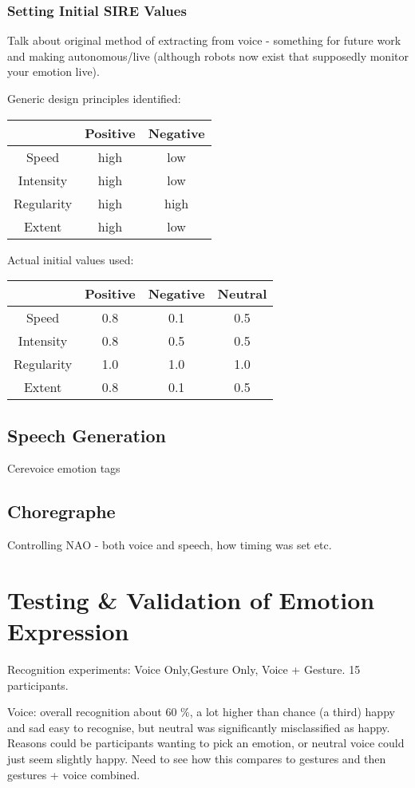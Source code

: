 \documentclass[11pt,a4paper]{report}
\begin{document}
\subsubsection{Setting Initial SIRE Values}
Talk about original method of extracting from voice - something for future work and making autonomous/live (although robots now exist that supposedly monitor your emotion live).

Generic design principles identified:

\begin{tabular}{|c|c|c|}
\hline & Positive & Negative \\ 
\hline Speed & high & low \\ 
\hline Intensity & high & low \\ 
\hline Regularity & high & high \\ 
\hline Extent & high & low \\ 
\hline 
\end{tabular} 

Actual initial values used:

\begin{tabular}{|c|c|c|c|}
\hline & Positive & Negative & Neutral \\ 
\hline Speed & 0.8 & 0.1 & 0.5\\ 
\hline Intensity & 0.8 & 0.5 & 0.5 \\ 
\hline Regularity & 1.0 & 1.0 & 1.0 \\ 
\hline Extent & 0.8 & 0.1 & 0.5\\ 
\hline 
\end{tabular} 

\subsection{Speech Generation}
Cerevoice emotion tags

\subsection{Choregraphe}
Controlling NAO - both voice and speech, how timing was set etc.

\section{Testing \& Validation of Emotion Expression}
Recognition experiments: Voice Only,Gesture Only, Voice + Gesture. 15 participants.

Voice: overall recognition about 60 \%, a lot higher than chance (a third) happy and sad easy to recognise, but neutral was significantly misclassified as happy. Reasons could be participants wanting to pick an emotion, or neutral voice could just seem slightly happy. Need to see how this compares to gestures and then gestures + voice combined.
\end{document}
